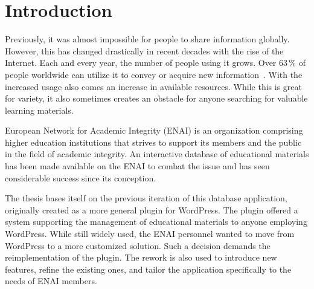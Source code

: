 \documentclass[
  digital,     %
  oneside,     %
  nosansbold,  %
  colorbold, %
  lof,         %
  lot,         %
]{fithesis4}
\begin{document}

\chapter{Introduction}

Previously, it was almost impossible for people to share information globally.
However, this has changed drastically in recent decades with the rise of the
Internet. Each and every year, the number of people using it grows. Over
63\,\% of people worldwide can utilize it to convey or acquire new
information~\cite{w3_wordpress}. With the increased usage also comes
an increase in available resources. While this is great for variety, it also
sometimes creates an obstacle for anyone searching for valuable learning
materials.

European Network for Academic Integrity (ENAI) is an organization comprising
higher education institutions that strives to support its members and the public
in the field of academic integrity. An interactive database of educational
materials has been made available on the ENAI to combat the issue and has seen
considerable success since its conception.

The thesis bases itself on the previous iteration of this database application,
originally created as a more general plugin for WordPress. The plugin offered
a system supporting the management of educational materials to anyone employing
WordPress. While still widely used, the ENAI personnel wanted to move from
WordPress to a more customized solution. Such a decision demands the
reimplementation of the plugin. The rework is also used to introduce new
features, refine the existing ones, and tailor the application specifically to
the needs of ENAI members.
\end{document}
